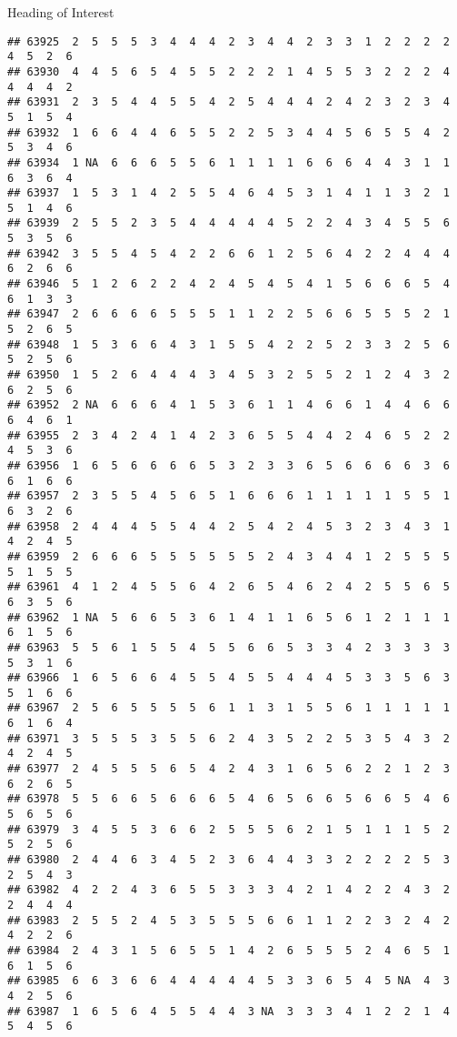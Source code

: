 \documentclass[
  ignorenonframetext,
]{beamer}
\begin{document}
\begin{frame}[fragile]{Heading of Interest}
\begin{verbatim}
## 63925  2  5  5  5  3  4  4  4  2  3  4  4  2  3  3  1  2  2  2  2  4  5  2  6
## 63930  4  4  5  6  5  4  5  5  2  2  2  1  4  5  5  3  2  2  2  4  4  4  4  2
## 63931  2  3  5  4  4  5  5  4  2  5  4  4  4  2  4  2  3  2  3  4  5  1  5  4
## 63932  1  6  6  4  4  6  5  5  2  2  5  3  4  4  5  6  5  5  4  2  5  3  4  6
## 63934  1 NA  6  6  6  5  5  6  1  1  1  1  6  6  6  4  4  3  1  1  6  3  6  4
## 63937  1  5  3  1  4  2  5  5  4  6  4  5  3  1  4  1  1  3  2  1  5  1  4  6
## 63939  2  5  5  2  3  5  4  4  4  4  4  5  2  2  4  3  4  5  5  6  5  3  5  6
## 63942  3  5  5  4  5  4  2  2  6  6  1  2  5  6  4  2  2  4  4  4  6  2  6  6
## 63946  5  1  2  6  2  2  4  2  4  5  4  5  4  1  5  6  6  6  5  4  6  1  3  3
## 63947  2  6  6  6  6  5  5  5  1  1  2  2  5  6  6  5  5  5  2  1  5  2  6  5
## 63948  1  5  3  6  6  4  3  1  5  5  4  2  2  5  2  3  3  2  5  6  5  2  5  6
## 63950  1  5  2  6  4  4  4  3  4  5  3  2  5  5  2  1  2  4  3  2  6  2  5  6
## 63952  2 NA  6  6  6  4  1  5  3  6  1  1  4  6  6  1  4  4  6  6  6  4  6  1
## 63955  2  3  4  2  4  1  4  2  3  6  5  5  4  4  2  4  6  5  2  2  4  5  3  6
## 63956  1  6  5  6  6  6  6  5  3  2  3  3  6  5  6  6  6  6  3  6  6  1  6  6
## 63957  2  3  5  5  4  5  6  5  1  6  6  6  1  1  1  1  1  5  5  1  6  3  2  6
## 63958  2  4  4  4  5  5  4  4  2  5  4  2  4  5  3  2  3  4  3  1  4  2  4  5
## 63959  2  6  6  6  5  5  5  5  5  5  2  4  3  4  4  1  2  5  5  5  5  1  5  5
## 63961  4  1  2  4  5  5  6  4  2  6  5  4  6  2  4  2  5  5  6  5  6  3  5  6
## 63962  1 NA  5  6  6  5  3  6  1  4  1  1  6  5  6  1  2  1  1  1  6  1  5  6
## 63963  5  5  6  1  5  5  4  5  5  6  6  5  3  3  4  2  3  3  3  3  5  3  1  6
## 63966  1  6  5  6  6  4  5  5  4  5  5  4  4  4  5  3  3  5  6  3  5  1  6  6
## 63967  2  5  6  5  5  5  5  6  1  1  3  1  5  5  6  1  1  1  1  1  6  1  6  4
## 63971  3  5  5  5  3  5  5  6  2  4  3  5  2  2  5  3  5  4  3  2  4  2  4  5
## 63977  2  4  5  5  5  6  5  4  2  4  3  1  6  5  6  2  2  1  2  3  6  2  6  5
## 63978  5  5  6  6  5  6  6  6  5  4  6  5  6  6  5  6  6  5  4  6  5  6  5  6
## 63979  3  4  5  5  3  6  6  2  5  5  5  6  2  1  5  1  1  1  5  2  5  2  5  6
## 63980  2  4  4  6  3  4  5  2  3  6  4  4  3  3  2  2  2  2  5  3  2  5  4  3
## 63982  4  2  2  4  3  6  5  5  3  3  3  4  2  1  4  2  2  4  3  2  2  4  4  4
## 63983  2  5  5  2  4  5  3  5  5  5  6  6  1  1  2  2  3  2  4  2  4  2  2  6
## 63984  2  4  3  1  5  6  5  5  1  4  2  6  5  5  5  2  4  6  5  1  6  1  5  6
## 63985  6  6  3  6  6  4  4  4  4  4  5  3  3  6  5  4  5 NA  4  3  4  2  5  6
## 63987  1  6  5  6  4  5  5  4  4  3 NA  3  3  3  4  1  2  2  1  4  5  4  5  6

\end{verbatim}
\end{frame}
\end{document}
